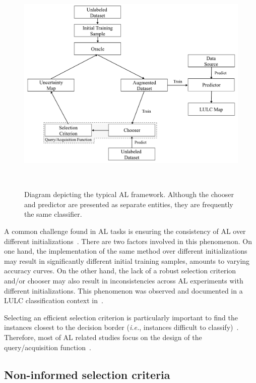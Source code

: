 \documentclass[preprint,12pt]{elsarticle}
\begin{document}
\begin{figure}[htb]
	\centering
	\includegraphics[width=\linewidth]{../analysis/al_typical}
	\caption{Diagram depicting the typical AL framework. Although the chooser
        and predictor are presented as separate entities, they are frequently
        the same classifier.
    }~\label{fig:al_typical}
\end{figure}

A common challenge found in AL tasks is ensuring the consistency of AL over
different initializations~\cite{Kottke2017}. There are two factors involved in
this phenomenon. On one hand, the implementation of the same method over
different initializations may result in significantly different initial
training samples, amounts to varying accuracy curves. On the other hand, the
lack of a robust selection criterion and/or chooser may also result in
inconsistencies across AL experiments with different initializations. This
phenomenon was observed and documented in a LULC classification context
in~\cite{tuia2011using}.

Selecting an efficient selection criterion is particularly important to find
the instances closest to the decision border (\textit{i.e.}, instances
difficult to classify)~\cite{Shrivastava2021}. Therefore, most of AL related
studies focus on the design of the query/acquisition function~\cite{Su2020}.

\subsection{Non-informed selection criteria}
\end{document}
